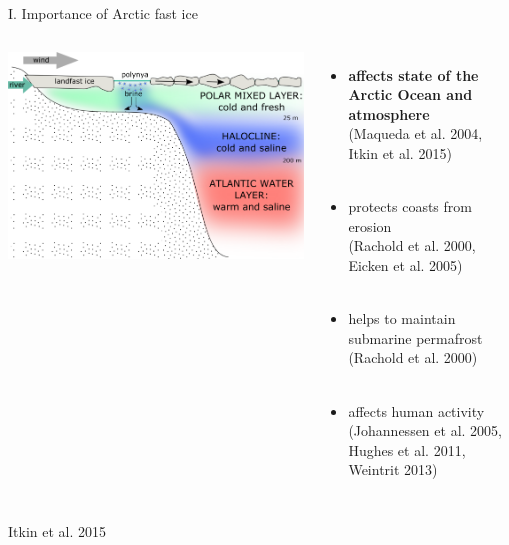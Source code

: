 \documentclass[8pt]{beamer}
\begin{document}
\setwatermark{\fontsize{125pt}{125pt}\selectfont{}}
\begin{frame}[fragile]{I. Importance of Arctic fast ice}
	\begin{columns}
			\includegraphics[width=1\textwidth]{./img/ImportanceFI.png}\\
		\begin{itemize}
			\item\textbf{affects state of the Arctic Ocean and atmosphere}\\(Maqueda et al. 2004, Itkin et al. 2015)\\~\\ 
			\item protects coasts from erosion\\(Rachold et al. 2000, Eicken et al. 2005)\\~\\ 
			\item helps to maintain submarine permafrost\\ (Rachold et al. 2000)\\~\\
			\item affects human activity\\(Johannessen et al. 2005, Hughes et al. 2011, Weintrit 2013)
		\end{itemize}
	\end{columns}

Itkin et al. 2015
\end{frame}
\end{document}
